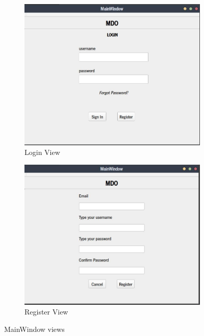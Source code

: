 \begin{figure}[htb!]
  \centering
  \begin{subfigure}{.6\textwidth}
  \includegraphics[width=\textwidth]{img/mw-login-view.jpg}%
  \caption{Login View}%
  \label{fig:mw-login-view}
\end{subfigure}

%
  \begin{subfigure}{.6\textwidth}
    \includegraphics[width=\textwidth]{img/mw-register-view.jpg}%
  \caption{Register View}%
  \label{fig:mw-register-view}
  \end{subfigure}
  \caption{MainWindow views}%
  \label{fig:ptp-test}
\end{figure}  

